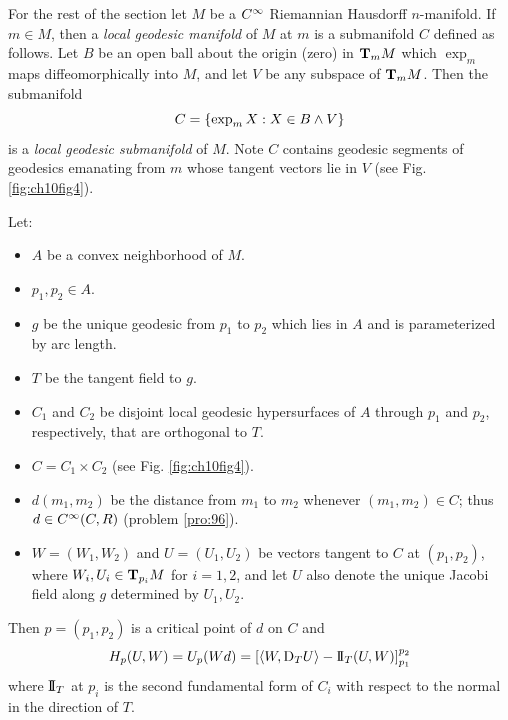 \documentclass[../main]{subfiles}
\begin{document}
For the rest of the section let $M$ be a $\CInfty$ Riemannian Hausdorff $n$-manifold. If $m\in M$, then a \emph{local geodesic manifold} of $M$ at $m$ is a submanifold $C$ defined as follows. Let $B$ be an open ball about the origin (zero) in $\ts Mm$ which $\exp_m$ maps diffeomorphically into $M$, and let $V$ be any subspace of $\ts Mm$. Then the submanifold
\[C = \brc{\exp_mX: X\in B\wedge V}\]
is a \emph{local geodesic submanifold} of $M$. Note $C$ contains geodesic segments of geodesics emanating from $m$ whose tangent vectors lie in $V$ (see Fig. \ref{fig:ch10fig4}).



\begin{lemma} \label{lem:ch10.4.1}
Let:
\begin{itemize}
    \item $A$ be a convex neighborhood of $M$.
    \item $p_1,p_2\in A$.
    \item $g$ be the unique geodesic from $p_1$ to $p_2$ which lies in $A$ and is parameterized by arc length.
    \item $T$ be the tangent field to $g$.
    \item $C_1$ and $C_2$ be disjoint local geodesic hypersurfaces of $A$ through $p_1$ and $p_2$, respectively, that are orthogonal to $T$.
    \item $C=C_1\times C_2$ (see Fig. \ref{fig:ch10fig4}).
    \item $d(m_1,m_2)$ be the distance from $m_1$ to $m_2$ whenever $(m_1,m_2)\in C$; thus $d\in\CInfty(C,R)$ (problem \ref{pro:96}).
    \item $W=(W_1,W_2)$ and $U=(U_1,U_2)$ be vectors tangent to $C$ at $(p_1,p_2)$, where $W_i,U_i\in\ts{M}{p_i}$ for $i=1,2$, and let $U$ also denote the unique Jacobi field along $g$ determined by $U_1,U_2$.
\end{itemize}
Then $p=(p_1,p_2)$ is a critical point of $d$ on $C$ and
\[H_p(U,W) = U_p(Wd) = \sbr{\ip{W}{\D_TU} - \secondForm_T(U,W)}_{p_1}^{p_2}\]
where $\secondForm_T$ at $p_i$ is the second fundamental form of $C_i$ with respect to the normal in the direction of $T$.
\end{lemma}

\end{document}
